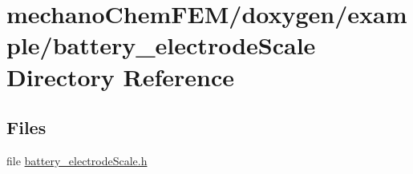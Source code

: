 \section{mechano\-Chem\-F\-E\-M/doxygen/example/battery\-\_\-electrode\-Scale Directory Reference}
\label{dir_5432c63fe6f04dcd244a0048daab7e41}
\subsection*{Files}
\begin{DoxyCompactItemize}
\item 
file \hyperlink{battery__electrode_scale_8h}{battery\-\_\-electrode\-Scale.\-h}
\end{DoxyCompactItemize}

